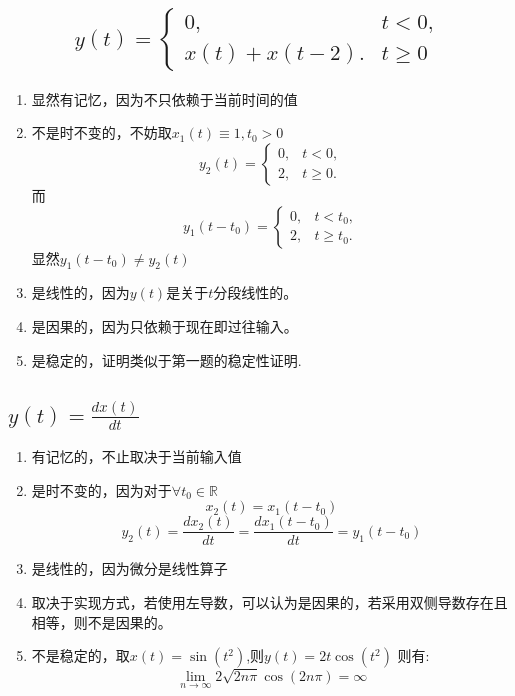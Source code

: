 \documentclass[UTF8, fontset=fandol,12pt, a4paper]{ctexart}
\begin{document}
\subsection{
  \[
    y(t) = \begin{cases}
      0, &t < 0, \\
      x(t) + x(t - 2). &t \ge 0
    \end{cases}
  \]
}

\begin{enumerate}
  \item 显然有记忆，因为不只依赖于当前时间的值
  \item 不是时不变的，不妨取$x_1(t) \equiv 1, t_0 > 0$
        \[
          y_2(t) = \begin{cases}
            0, &t<0, \\
            2, &t\ge 0.
          \end{cases}
        \]
        而
        \[
          y_1(t - t_0) = \begin{cases}
            0, &t<t_0, \\
            2, &t\ge t_0.
          \end{cases}
        \]
        显然$y_1(t-t_0) \ne y_2(t)$
  \item 是线性的，因为$y(t)$是关于$t$分段线性的。
  \item 是因果的，因为只依赖于现在即过往输入。
  \item 是稳定的，证明类似于第一题的稳定性证明.
\end{enumerate}

\subsection{$y(t) = \frac{dx(t)}{dt}$}
\begin{enumerate}
  \item 有记忆的，不止取决于当前输入值
  \item 是时不变的，因为对于$\forall t_0 \in \mathbb{R}$
        $$x_2(t) = x_1(t-t_0)$$
        $$y_2(t) = \frac{dx_2(t)}{dt} = \frac{dx_1(t-t_0)}{dt} = y_1(t-t_0)$$
  \item 是线性的，因为微分是线性算子
  \item 取决于实现方式，若使用左导数，可以认为是因果的，若采用双侧导数存在且相等，则不是因果的。
  \item 不是稳定的，取$x(t) = \sin{(t^2)}$,则$y(t) = 2t \cos{(t^2)}$ 则有: \\
        $$\lim_{n \rightarrow \infty}2\sqrt{2n\pi}\cos{(2n\pi)} = \infty$$
\end{enumerate}
\end{document}

